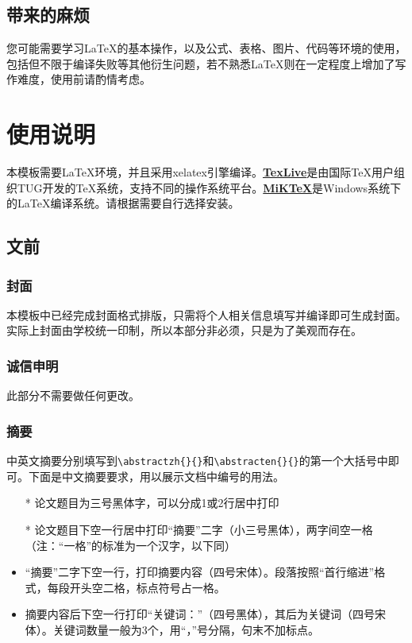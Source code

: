\documentclass{bucthesis}
\begin{document}
\section{带来的麻烦}{\par
	您可能需要学习\LaTeX{}的基本操作，以及公式、表格、图片、代码等环境的使用，包括但不限于编译失败等其他衍生问题，若不熟悉\LaTeX{}则在一定程度上增加了写作难度，使用前请酌情考虑。\par}

\chapter{使用说明}{\par
	本模板需要\LaTeX{}环境，并且采用xelatex引擎编译。{\textbf{\href{http://tug.org/texlive/}{TexLive}}}是由国际TeX用户组织TUG开发的TeX系统，支持不同的操作系统平台。{\textbf{\href{https://miktex.org/}{MiKTeX}}}是Windows系统下的\LaTeX{}编译系统。请根据需要自行选择安装。}\label{use}
\section{文前}
\subsection{封面}{\par
	本模板中已经完成封面格式排版，只需将个人相关信息填写并编译即可生成封面。实际上封面由学校统一印制，所以本部分非必须，只是为了美观而存在。}
\subsection{诚信申明}{\par
	此部分不需要做任何更改。}
\subsection{摘要}{\par
	中英文摘要分别填写到\verb|\abstractzh{}{}|和\verb|\abstracten{}{}|的第一个大括号中即可。下面是中文摘要要求，用以展示文档中编号的用法。
	\begin{itemize}
		\item[*] 论文题目为三号黑体字，可以分成1或2行居中打印
		\item[*] 论文题目下空一行居中打印“摘要”二字（小三号黑体），两字间空一格（注：“一格”的标准为一个汉字，以下同）
		\item “摘要”二字下空一行，打印摘要内容（四号宋体）。段落按照“首行缩进”格式，每段开头空二格，标点符号占一格。
		\item 摘要内容后下空一行打印“关键词：”（四号黑体），其后为关键词（四号宋体）。关键词数量一般为3个，用“，”号分隔，句末不加标点。
	\end{itemize}}
\end{document}
